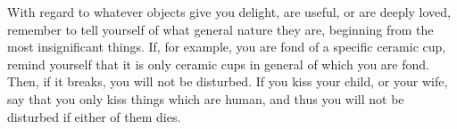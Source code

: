 With regard to whatever objects give you delight, are useful, or
are deeply loved, remember to tell yourself of what general nature
they are, beginning from the most insignificant things. If, for example,
you are fond of a specific ceramic cup, remind yourself that it is
only ceramic cups in general of which you are fond. Then, if it breaks,
you will not be disturbed. If you kiss your child, or your wife, say
that you only kiss things which are human, and thus you will not be
disturbed if either of them dies. 
